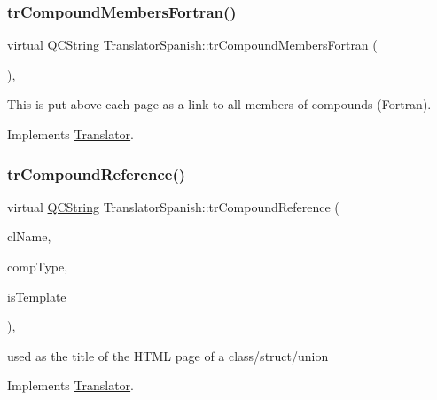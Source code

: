 \subsubsection{\texorpdfstring{trCompoundMembersFortran()}{trCompoundMembersFortran()}}
{\footnotesize\ttfamily virtual \mbox{\hyperlink{class_q_c_string}{Q\+C\+String}} Translator\+Spanish\+::tr\+Compound\+Members\+Fortran (\begin{DoxyParamCaption}{ }\end{DoxyParamCaption})\hspace{0.3cm}{\ttfamily [inline]}, {\ttfamily [virtual]}}

This is put above each page as a link to all members of compounds (Fortran). 

Implements \mbox{\hyperlink{class_translator}{Translator}}.

\mbox{\label{class_translator_spanish_a2ee6ca88647877d7e371c0a02296342f}} 
\subsubsection{\texorpdfstring{trCompoundReference()}{trCompoundReference()}}
{\footnotesize\ttfamily virtual \mbox{\hyperlink{class_q_c_string}{Q\+C\+String}} Translator\+Spanish\+::tr\+Compound\+Reference (\begin{DoxyParamCaption}\item[{const char $\ast$}]{cl\+Name,  }\item[{\mbox{\hyperlink{class_class_def_ae70cf86d35fe954a94c566fbcfc87939}{Class\+Def\+::\+Compound\+Type}}}]{comp\+Type,  }\item[{bool}]{is\+Template }\end{DoxyParamCaption})\hspace{0.3cm}{\ttfamily [inline]}, {\ttfamily [virtual]}}

used as the title of the H\+T\+ML page of a class/struct/union 

Implements \mbox{\hyperlink{class_translator}{Translator}}.

\mbox{\label{class_translator_spanish_a32074599937e0793683d29b9ccb56ee8}} 
